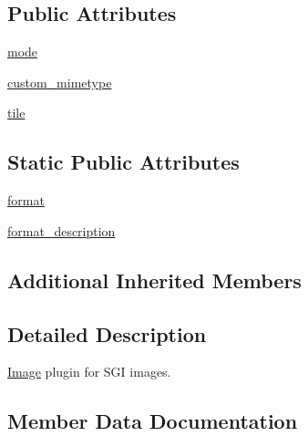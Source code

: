 \subsection*{Public Attributes}
\begin{DoxyCompactItemize}
\item 
\hyperlink{classPIL_1_1SgiImagePlugin_1_1SgiImageFile_acc679a42cf76e5731fb1a95054be1bea}{mode}
\item 
\hyperlink{classPIL_1_1SgiImagePlugin_1_1SgiImageFile_a80bad01d6a509f98526c668b8974e313}{custom\+\_\+mimetype}
\item 
\hyperlink{classPIL_1_1SgiImagePlugin_1_1SgiImageFile_a4357af2d8b3a4fa1d9188d613e11496c}{tile}
\end{DoxyCompactItemize}
\subsection*{Static Public Attributes}
\begin{DoxyCompactItemize}
\item 
\hyperlink{classPIL_1_1SgiImagePlugin_1_1SgiImageFile_a34d95949959dfb99b41a79a5f6bb5b11}{format}
\item 
\hyperlink{classPIL_1_1SgiImagePlugin_1_1SgiImageFile_a480f225cbb064ed73ea17396841d906c}{format\+\_\+description}
\end{DoxyCompactItemize}
\subsection*{Additional Inherited Members}


\subsection{Detailed Description}
\hyperlink{namespacePIL_1_1Image}{Image} plugin for S\+GI images. 



\subsection{Member Data Documentation}
\mbox{\label{classPIL_1_1SgiImagePlugin_1_1SgiImageFile_a80bad01d6a509f98526c668b8974e313}} 
